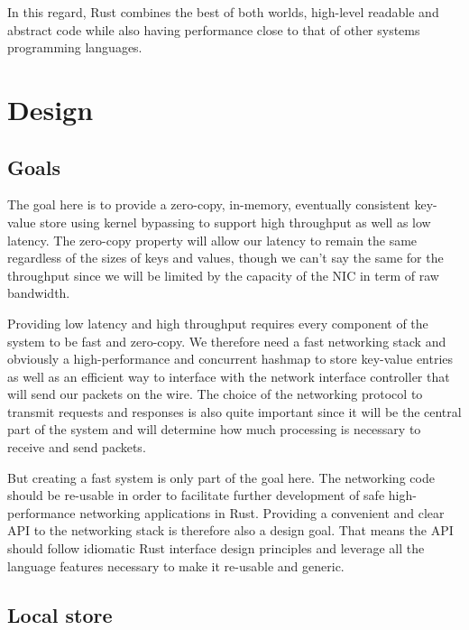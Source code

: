 \documentclass[11pt]{book}
\newcommand{\marios}[1]{\noindent{{\bf \fbox{MK:} {\textcolor{green}{\it#1}}}}}
\begin{document}
In this regard, Rust combines the best of both worlds, high-level
readable and abstract code while also having performance close to that
of other systems programming languages.

\chapter{Design}

\section{Goals} \label{design-goals}

The goal here is to provide a zero-copy, in-memory, eventually
consistent key-value store using kernel bypassing to support high
throughput as well as low latency. The zero-copy property will allow
our latency to remain the same regardless of the sizes of keys and
values, though we can't say the same for the throughput since we will
be limited by the capacity of the NIC in term of raw bandwidth.

Providing low latency and high throughput requires every component of
the system to be fast and zero-copy. We therefore need a fast
networking stack and obviously a high-performance and concurrent
hashmap to store key-value entries as well as an efficient way to
interface with the network interface controller that will send our
packets on the wire. The choice of the networking protocol to transmit
requests and responses is also quite important since it will be the
central part of the system and will determine how much processing is
necessary to receive and send packets.

But creating a fast system is only part of the goal here. The
networking code should be re-usable in order to facilitate further
development of safe high-performance networking
applications in Rust. Providing a convenient and clear API to the
networking stack is therefore also a design goal. That means the API
should follow idiomatic Rust interface design principles and leverage
all the language features necessary to make it re-usable and generic.

\marios{You need a layered diagram here starting from hardware all the way up to the application that lists the software componenets that you'll talk about later. Once you have that it's way cleaner to understand what are the following sections.}

\section{Local store} \label{sec:local-store-design}
\end{document}
